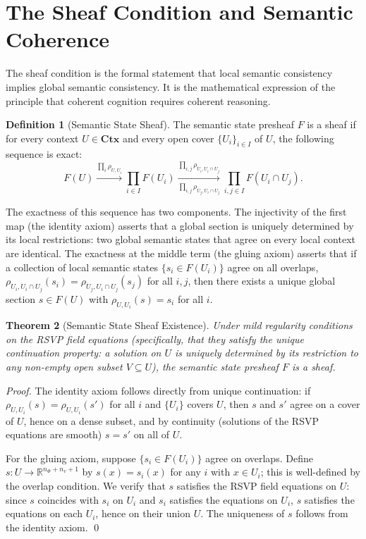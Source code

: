 \documentclass[12pt, a4paper, openany]{book}
\theoremstyle{plain}
\newtheorem{theorem}{Theorem}[chapter]
\theoremstyle{definition}
\newtheorem{definition}[theorem]{Definition}
\theoremstyle{remark}
\begin{document}
\section{The Sheaf Condition and Semantic Coherence}

The sheaf condition is the formal statement that local semantic consistency implies global semantic consistency. It is the mathematical expression of the principle that coherent cognition requires coherent reasoning.

\begin{definition}[Semantic State Sheaf]
The semantic state presheaf $F$ is a sheaf if for every context $U \in \mathbf{Ctx}$ and every open cover $\{U_i\}_{i \in I}$ of $U$, the following sequence is exact:
\[
F(U) \xrightarrow{\prod_i \rho_{U, U_i}} \prod_{i \in I} F(U_i) \xrightarrow[\prod_{i,j} \rho_{U_j, U_i \cap U_j}]{\prod_{i,j} \rho_{U_i, U_i \cap U_j}} \prod_{i,j \in I} F(U_i \cap U_j).
\]
\end{definition}

The exactness of this sequence has two components. The injectivity of the first map (the identity axiom) asserts that a global section is uniquely determined by its local restrictions: two global semantic states that agree on every local context are identical. The exactness at the middle term (the gluing axiom) asserts that if a collection of local semantic states $\{s_i \in F(U_i)\}$ agree on all overlaps, $\rho_{U_i, U_i \cap U_j}(s_i) = \rho_{U_j, U_i \cap U_j}(s_j)$ for all $i, j$, then there exists a unique global section $s \in F(U)$ with $\rho_{U, U_i}(s) = s_i$ for all $i$.

\begin{theorem}[Semantic State Sheaf Existence]
Under mild regularity conditions on the RSVP field equations (specifically, that they satisfy the unique continuation property: a solution on $U$ is uniquely determined by its restriction to any non-empty open subset $V \subseteq U$), the semantic state presheaf $F$ is a sheaf.
\end{theorem}

\begin{proof}
The identity axiom follows directly from unique continuation: if $\rho_{U, U_i}(s) = \rho_{U, U_i}(s')$ for all $i$ and $\{U_i\}$ covers $U$, then $s$ and $s'$ agree on a cover of $U$, hence on a dense subset, and by continuity (solutions of the RSVP equations are smooth) $s = s'$ on all of $U$.

For the gluing axiom, suppose $\{s_i \in F(U_i)\}$ agree on overlaps. Define $s: U \to \mathbb{R}^{n_\Phi + n_v + 1}$ by $s(x) = s_i(x)$ for any $i$ with $x \in U_i$; this is well-defined by the overlap condition. We verify that $s$ satisfies the RSVP field equations on $U$: since $s$ coincides with $s_i$ on $U_i$ and $s_i$ satisfies the equations on $U_i$, $s$ satisfies the equations on each $U_i$, hence on their union $U$. The uniqueness of $s$ follows from the identity axiom. \qed
\end{proof}
\end{document}
